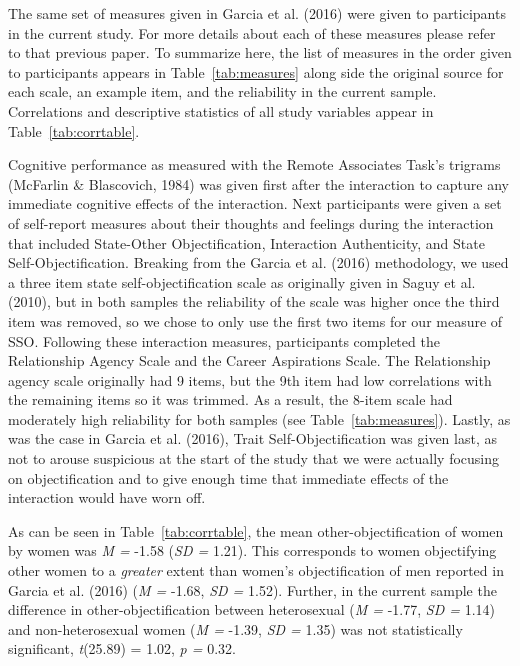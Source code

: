 \documentclass[man]{apa6}
\begin{document}
The same set of measures given in Garcia et al. (2016) were given to
participants in the current study. For more details about each of these
measures please refer to that previous paper. To summarize here, the
list of measures in the order given to participants appears in
Table~\ref{tab:measures} along side the original source for each scale,
an example item, and the reliability in the current sample. Correlations
and descriptive statistics of all study variables appear in
Table~\ref{tab:corrtable}.

Cognitive performance as measured with the Remote Associates Task's
trigrams (McFarlin \& Blascovich, 1984) was given first after the
interaction to capture any immediate cognitive effects of the
interaction. Next participants were given a set of self-report measures
about their thoughts and feelings during the interaction that included
State-Other Objectification, Interaction Authenticity, and State
Self-Objectification. Breaking from the Garcia et al. (2016)
methodology, we used a three item state self-objectification scale as
originally given in Saguy et al. (2010), but in both samples the
reliability of the scale was higher once the third item was removed, so
we chose to only use the first two items for our measure of SSO.
Following these interaction measures, participants completed the
Relationship Agency Scale and the Career Aspirations Scale. The
Relationship agency scale originally had 9 items, but the 9th item had
low correlations with the remaining items so it was trimmed. As a
result, the 8-item scale had moderately high reliability for both
samples (see Table~\ref{tab:measures}). Lastly, as was the case in
Garcia et al. (2016), Trait Self-Objectification was given last, as not
to arouse suspicious at the start of the study that we were actually
focusing on objectification and to give enough time that immediate
effects of the interaction would have worn off.

As can be seen in Table~\ref{tab:corrtable}, the mean
other-objectification of women by women was \emph{M =} -1.58 (\emph{SD
=} 1.21). This corresponds to women objectifying other women to a
\emph{greater} extent than women's objectification of men reported in
Garcia et al. (2016) (\emph{M =} -1.68, \emph{SD =} 1.52). Further, in
the current sample the difference in other-objectification between
heterosexual (\emph{M =} -1.77, \emph{SD =} 1.14) and non-heterosexual
women (\emph{M =} -1.39, \emph{SD =} 1.35) was not statistically
significant, \emph{t}(25.89) = 1.02, \emph{p =} 0.32.
\end{document}
